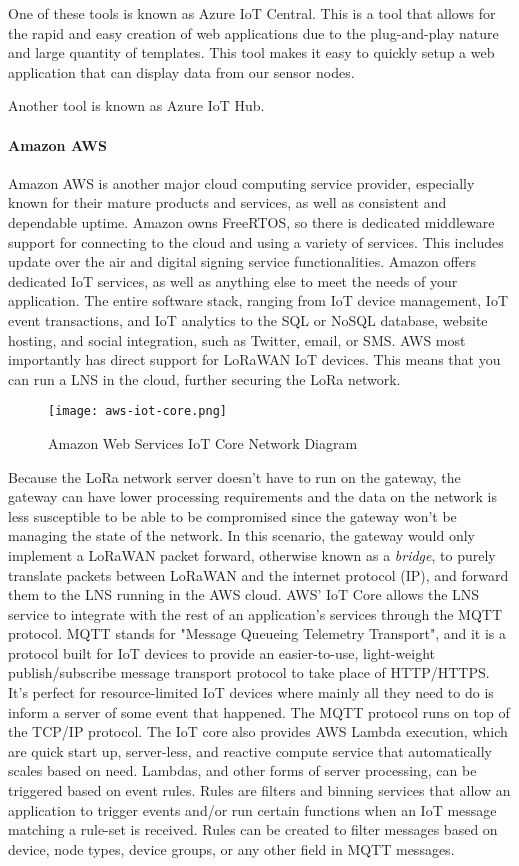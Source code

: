 One of these tools is known as Azure IoT Central. This is a tool that allows for the rapid and easy creation of web applications due to the plug-and-play nature and large quantity of templates. This tool makes it easy to quickly setup a web application that can display data from our sensor nodes.

Another tool is known as Azure IoT Hub.

\paragraph{Amazon AWS}
Amazon AWS is another major cloud computing service provider, especially known
for their mature products and services, as well as consistent and dependable
uptime. Amazon owns FreeRTOS, so there is dedicated middleware support for
connecting to the cloud and using a variety of services. This includes update
over the air and digital signing service functionalities. Amazon offers
dedicated IoT services, as well as anything else to meet the needs of your
application. The entire software stack, ranging from IoT device management, IoT
event transactions, and IoT analytics to the SQL or NoSQL database, website
hosting, and social integration, such as Twitter, email, or SMS. AWS most
importantly has direct support for LoRaWAN IoT devices. This means that you can
run a LNS in the cloud, further securing the LoRa network. 

\begin{figure}
  \centering
  \texttt{[image: aws-iot-core.png]}
  \caption{Amazon Web Services IoT Core Network Diagram}
  \label{aws-iot-core}
\end{figure}

Because the LoRa network server doesn't have to run on the gateway, the gateway
can have lower processing requirements and the data on the network is  less
susceptible to be able to be compromised since the gateway won't be managing the
state of the network. In this scenario, the gateway would only implement a
LoRaWAN packet forward, otherwise known as a \emph{bridge}, to purely translate
packets between LoRaWAN and the internet protocol (IP), and forward them to the
LNS running in the AWS cloud. AWS' IoT Core allows the LNS service to integrate
with the rest of an application's services through the MQTT protocol. MQTT
stands for "Message Queueing Telemetry Transport", and it is a protocol built
for IoT devices to provide an easier-to-use, light-weight publish/subscribe
message transport protocol to take place of HTTP/HTTPS. It's perfect for
resource-limited IoT devices where mainly all they need to do is inform a server
of some event that happened. The MQTT protocol runs on top of the TCP/IP
protocol. The IoT core also provides AWS Lambda execution, which are quick start
up, server-less, and reactive compute service that automatically scales based on
need. Lambdas, and other forms of server processing, can be triggered based on
event rules. Rules are filters and binning services that allow an application to
trigger events and/or run certain functions when an IoT message matching a
rule-set is received. Rules can be created to filter messages based on device,
node types, device groups, or any other field in MQTT messages.


